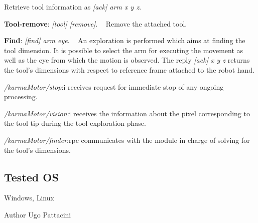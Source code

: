 \begin{DoxyItemize}
\begin{DoxyEnumerate}
 Retrieve tool information as {\itshape \mbox{[}ack\mbox{]} arm x y z}.
\item {\bfseries Tool-\/remove}\+: {\itshape \mbox{[}tool\mbox{]} \mbox{[}remove\mbox{]}}. ~\newline
 Remove the attached tool.
\item {\bfseries Find}\+: {\itshape \mbox{[}find\mbox{]} arm eye}. ~\newline
 An exploration is performed which aims at finding the tool dimension. It is possible to select the arm for executing the movement as well as the eye from which the motion is observed. The reply {\itshape \mbox{[}ack\mbox{]} x y z} returns the tool's dimensions with respect to reference frame attached to the robot hand.
\end{DoxyEnumerate}
\item {\itshape /karma\+Motor/stop}\+:i receives request for immediate stop of any ongoing processing.
\item {\itshape /karma\+Motor/vision}\+:i receives the information about the pixel corresponding to the tool tip during the tool exploration phase.
\item {\itshape /karma\+Motor/finder}\+:rpc communicates with the module in charge of solving for the tool's dimensions.
\end{DoxyItemize}\hypertarget{group__karmaToolProjection_tested_os_sec}{}\subsection{Tested O\+S}\label{group__karmaToolProjection_tested_os_sec}
Windows, Linux

\begin{DoxyAuthor}{Author}
Ugo Pattacini 
\end{DoxyAuthor}
